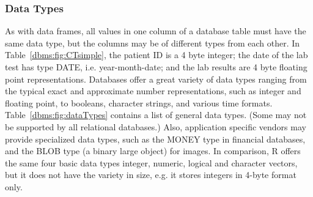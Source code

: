 \subsubsection{Data Types}
As with data frames, all values in one column of a database table 
must have the same data type, but the columns may be of different types
from each other.
In Table~\ref{dbms:fig:CTsimple}, the patient ID is a 4 byte integer;
the date of the lab test has type DATE, i.e. year-month-date; 
and the lab results are 4 byte floating point representations.
Databases offer a great variety of data types ranging from the typical
exact and approximate number representations, such as integer and 
floating point, to booleans, character strings, and various time formats. 
Table~\ref{dbms:fig:dataTypes} contains a list of general data types.
(Some may not be supported by all relational databases.)
Also, application specific vendors may provide specialized data types,
such as the MONEY type in financial databases, and the BLOB type (a binary
large object) for images.
In comparison, R offers the same four basic data types integer, numeric, 
logical and character vectors, but  
it does not have the variety in size, e.g. it stores integers in 4-byte format
only.

